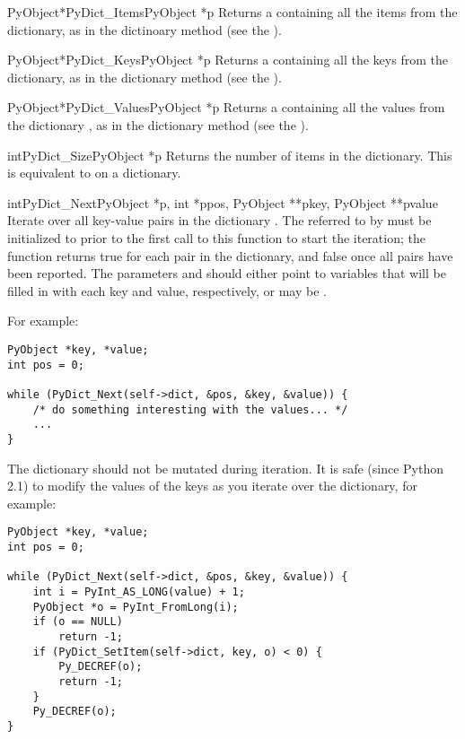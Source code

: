 \documentclass{manual}
\begin{document}
\begin{cfuncdesc}{PyObject*}{PyDict_Items}{PyObject *p}
Returns a  containing all the items 
from the dictionary, as in the dictinoary method  (see
the ).
\end{cfuncdesc}

\begin{cfuncdesc}{PyObject*}{PyDict_Keys}{PyObject *p}
Returns a  containing all the keys 
from the dictionary, as in the dictionary method  (see the
).
\end{cfuncdesc}

\begin{cfuncdesc}{PyObject*}{PyDict_Values}{PyObject *p}
Returns a  containing all the values 
from the dictionary , as in the dictionary method
 (see the ).
\end{cfuncdesc}

\begin{cfuncdesc}{int}{PyDict_Size}{PyObject *p}
Returns the number of items in the dictionary.  This is equivalent to
 on a dictionary.
\end{cfuncdesc}

\begin{cfuncdesc}{int}{PyDict_Next}{PyObject *p, int *ppos,
                                    PyObject **pkey, PyObject **pvalue}
Iterate over all key-value pairs in the dictionary .  The
 referred to by  must be initialized to 
prior to the first call to this function to start the iteration; the
function returns true for each pair in the dictionary, and false once
all pairs have been reported.  The parameters  and
 should either point to  variables that
will be filled in with each key and value, respectively, or may be
\NULL.

For example:

\begin{verbatim}
PyObject *key, *value;
int pos = 0;

while (PyDict_Next(self->dict, &pos, &key, &value)) {
    /* do something interesting with the values... */
    ...
}
\end{verbatim}

The dictionary  should not be mutated during iteration.  It is
safe (since Python 2.1) to modify the values of the keys as you
iterate over the dictionary, for example:

\begin{verbatim}
PyObject *key, *value;
int pos = 0;

while (PyDict_Next(self->dict, &pos, &key, &value)) {
    int i = PyInt_AS_LONG(value) + 1;
    PyObject *o = PyInt_FromLong(i);
    if (o == NULL)
        return -1;
    if (PyDict_SetItem(self->dict, key, o) < 0) {
        Py_DECREF(o);
        return -1;
    }
    Py_DECREF(o);
}
\end{verbatim}
\end{cfuncdesc}
\end{document}
